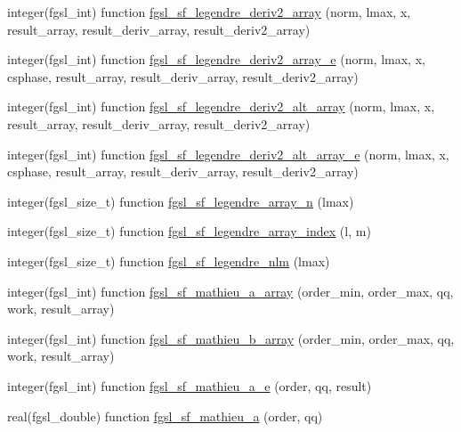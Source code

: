 \begin{DoxyCompactItemize}
\item 
integer(fgsl\+\_\+int) function \hyperlink{specfunc_8finc_aca8cc50f547f2dff534fef7c77436f12}{fgsl\+\_\+sf\+\_\+legendre\+\_\+deriv2\+\_\+array} (norm, lmax, x, result\+\_\+array, result\+\_\+deriv\+\_\+array, result\+\_\+deriv2\+\_\+array)
\item 
integer(fgsl\+\_\+int) function \hyperlink{specfunc_8finc_a124846277879422658e8e7ce28126be2}{fgsl\+\_\+sf\+\_\+legendre\+\_\+deriv2\+\_\+array\+\_\+e} (norm, lmax, x, csphase, result\+\_\+array, result\+\_\+deriv\+\_\+array, result\+\_\+deriv2\+\_\+array)
\item 
integer(fgsl\+\_\+int) function \hyperlink{specfunc_8finc_a0bda3a6769c0750fdceb8a6ace969a37}{fgsl\+\_\+sf\+\_\+legendre\+\_\+deriv2\+\_\+alt\+\_\+array} (norm, lmax, x, result\+\_\+array, result\+\_\+deriv\+\_\+array, result\+\_\+deriv2\+\_\+array)
\item 
integer(fgsl\+\_\+int) function \hyperlink{specfunc_8finc_a055b7f9db4e4175db1485de18f08373c}{fgsl\+\_\+sf\+\_\+legendre\+\_\+deriv2\+\_\+alt\+\_\+array\+\_\+e} (norm, lmax, x, csphase, result\+\_\+array, result\+\_\+deriv\+\_\+array, result\+\_\+deriv2\+\_\+array)
\item 
integer(fgsl\+\_\+size\+\_\+t) function \hyperlink{specfunc_8finc_a62a4fe2dd1b7e804e29fd166d6c6023d}{fgsl\+\_\+sf\+\_\+legendre\+\_\+array\+\_\+n} (lmax)
\item 
integer(fgsl\+\_\+size\+\_\+t) function \hyperlink{specfunc_8finc_a25f0caacfe33b34b24dd55d981f5442a}{fgsl\+\_\+sf\+\_\+legendre\+\_\+array\+\_\+index} (l, m)
\item 
integer(fgsl\+\_\+size\+\_\+t) function \hyperlink{specfunc_8finc_a5cdd1c5733a33cf86742533eb2b90b82}{fgsl\+\_\+sf\+\_\+legendre\+\_\+nlm} (lmax)
\item 
integer(fgsl\+\_\+int) function \hyperlink{specfunc_8finc_aa59332c2451aeb0c8f94f6bf117e64d3}{fgsl\+\_\+sf\+\_\+mathieu\+\_\+a\+\_\+array} (order\+\_\+min, order\+\_\+max, qq, work, result\+\_\+array)
\item 
integer(fgsl\+\_\+int) function \hyperlink{specfunc_8finc_a251e5a584288996df2e2d2b4be7f4457}{fgsl\+\_\+sf\+\_\+mathieu\+\_\+b\+\_\+array} (order\+\_\+min, order\+\_\+max, qq, work, result\+\_\+array)
\item 
integer(fgsl\+\_\+int) function \hyperlink{specfunc_8finc_a55cd9a0266d607cdde291c0a8d2e9c5e}{fgsl\+\_\+sf\+\_\+mathieu\+\_\+a\+\_\+e} (order, qq, result)
\item 
real(fgsl\+\_\+double) function \hyperlink{specfunc_8finc_a88949fc99c1bfe013453c835b8e23560}{fgsl\+\_\+sf\+\_\+mathieu\+\_\+a} (order, qq)

\end{DoxyCompactItemize}
